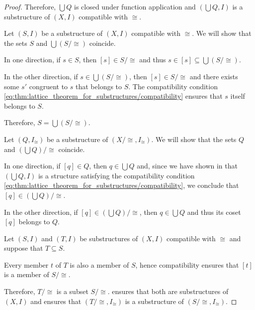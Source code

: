 \begin{proof}
  Therefore, \( \bigcup Q \) is closed under function application and \( (\bigcup Q, I) \) is a substructure of \( (X, I) \) compatible with \( {\cong} \).

   Let \( (S, I) \) be a substructure of \( (X, I) \) compatible with \( {\cong} \). We will show that the sets \( S \) and \( \bigcup(S / {\cong}) \) coincide.

  In one direction, if \( s \in S \), then \( [s] \in S / {\cong} \) and thus \( s \in [s] \subseteq \bigcup (S / {\cong}) \).

  In the other direction, if \( s \in \bigcup (S / {\cong}) \), then \( [s] \in S / {\cong} \) and there exists some \( s' \) congruent to \( s \) that belongs to \( S \). The compatibility condition \eqref{eq:thm:lattice_theorem_for_substructures/compatibility} ensures that \( s \) itself belongs to \( S \).

  Therefore, \( S = \bigcup(S / {\cong}) \).

   Let \( (Q, I_\cong) \) be a substructure of \( (X / {\cong}, I_\cong) \). We will show that the sets \( Q \) and \( (\bigcup Q) / {\cong} \) coincide.

  In one direction, if \( [q] \in Q \), then \( q \in \bigcup Q \) and, since we have shown in  that \( (\bigcup Q, I) \) is a structure satisfying the compatibility condition \eqref{eq:thm:lattice_theorem_for_substructures/compatibility}, we conclude that \( [q] \in (\bigcup Q) / {\cong} \).

  In the other direction, if \( [q] \in (\bigcup Q) / {\cong} \), then \( q \in \bigcup Q \) and thus its coset \( [q] \) belongs to \( Q \).

   Let \( (S, I) \) and \( (T, I) \) be substructures of \( (X, I) \) compatible with \( {\cong} \) and suppose that \( T \subseteq S \).

  Every member \( t \) of \( T \) is also a member of \( S \), hence compatibility ensures that \( [t] \) is a member of \( S / {\cong} \).

  Therefore, \( T / {\cong} \) is a subset \( S / {\cong} \).  ensures that both are substructures of \( (X, I) \) and  ensures that \( (T / {\cong}, I_\cong) \) is a substructure of \( (S / {\cong}, I_\cong) \).


\end{proof}
